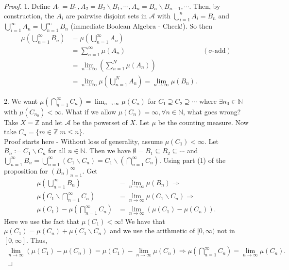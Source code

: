 \documentclass[letterpaper, 12pt]{article}
\newcommand{\bN}{\mathbb{N}}
\newcommand{\bZ}{\mathbb{Z}}
\newcommand{\sA}{\mathcal{A}}
\theoremstyle{stdthm}
\theoremstyle{stddef}
\theoremstyle{stdnonum}
\theoremstyle{stdqands}
\theoremstyle{stdbold}
\begin{document}
\begin{proof}

1. Define $A_1 = B_1, A_2 = B_2 \backslash B_1,\cdots, A_ n = B_n \backslash B_{n-1}, \cdots$. Then, by construction, the $A_i$ are pairwise disjoint sets in $\sA$ with $\bigcup_{i=1}^n A_i = B_n$ and $\bigcup_{i=1}^\infty A_n = \bigcup_{n=1}^\infty B_n$ (immediate Boolean Algebra - Check!). So then
\begin{align*}
\mu\left( \bigcup_{n=1}^\infty B_n \right) &= \mu \left( \bigcup_{n=1}^\infty A_n \right)\\
&= \sum_{n=1}^\infty \mu(A_n) & (\sigma \text{-add})\\
&= \lim_{n\rightarrow \infty} \left( \sum_{n=1}^N \mu(A_n) \right) \\
&= \lim_{n\rightarrow \infty}\mu \left(\bigcup_{n=1}^N A_n \right) = \lim_{n\rightarrow \infty} \mu(B_n).
\end{align*}

2. We want $\mu(\bigcap_{n=1}^\infty C_n) = \lim_{n\rightarrow \infty} \mu(C_n)$ for $C_1 \supseteq C_2 \supseteq \cdots $ where $\exists n_0 \in \bN$ with $\mu(C_{n_0})<\infty$. What if we allow $\mu(C_n) = \infty, \forall n \in \bN$, what goes wrong? \\

Take $X = \bZ$ and let $\sA$ be the powerset of $X$. Let $\mu$ be the counting measure. Now take $C_n = \{m \in \bZ | m \leq n \}$.\\



Proof starts here - Without loss of generality, assume $\mu(C_1) < \infty$. Let $B_n := C_1 \backslash C_n$ for all $n \in \bN$. Then we have $\emptyset = B_1 \subseteq B_2 \subseteq \cdots$ and $\bigcup_{n=1}^\infty B_n = \bigcup_{n=1}^\infty (C_1 \backslash C_n) = C_1 \backslash \left( \bigcap_{n=1}^{\infty}C_n \right)$. Using part (1) of the proposition for $\left( B_n \right)_{n=1}^\infty$. Get 
\begin{align*}
\mu \left( \bigcup_{n=1}^\infty B_n \right) &= \lim_{n\rightarrow \infty} \mu(B_n) \Rightarrow\\
\mu\left( C_1 \backslash \bigcap_{n=1}^\infty C_n \right) &= \lim_{n\rightarrow \infty} \mu \left( C_1 \backslash C_n \right)\Rightarrow\\
\mu(C_1) - \mu\left(\bigcap_{n=1}^\infty C_n \right) &= \lim_{n\rightarrow \infty} \left( \mu(C_1) - \mu(C_n)\right).
\end{align*}
Here we use the fact that $\mu(C_1) < \infty$! We have that $\mu(C_1) = \mu(C_n) + \mu(C_1\backslash C_n)$ and we use the arithmetic of $[0,\infty)$ not in $[0,\infty]$. Thus,
\begin{align*}
\lim_{n\rightarrow \infty} \left( \mu(C_1) - \mu(C_n)\right) = \mu(C_1) - \lim_{n\rightarrow \infty} \mu(C_n) \Rightarrow \mu \left(\bigcap_{n=1}^\infty C_n \right)  = \lim_{n\rightarrow \infty} \mu(C_n).
\end{align*} 
\end{proof}
\end{document}
